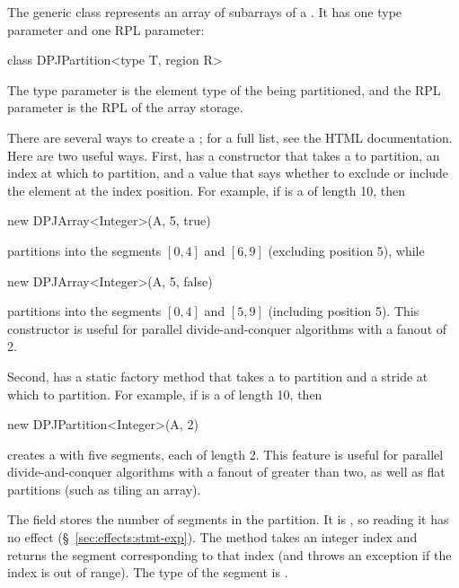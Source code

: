   The generic 
class represents an array of subarrays of a .  It has
one type parameter and one RPL parameter:
%
\begin{dpjlisting}
class DPJPartition<type T, region R>
\end{dpjlisting}
%
The type parameter is the element type of the  being
partitioned, and the RPL parameter is the RPL of the array storage.

 There are several ways to
create a ; for a full list, see the HTML
documentation.  Here are two useful ways.  First, 
has a constructor that takes a  to partition, an index
at which to partition, and a  value that says whether to
exclude or include the element at the index position.  For example, if
 is a  of length 10, then
%
\begin{dpjlisting}
new DPJArray<Integer>(A, 5, true)
\end{dpjlisting}
%
partitions  into the segments $[0,4]$ and $[6,9]$ (excluding
position 5), while
%
\begin{dpjlisting}
new DPJArray<Integer>(A, 5, false)
\end{dpjlisting}
%
partitions  into the segments $[0,4]$ and $[5,9]$ (including
position 5).  This constructor is useful for parallel
divide-and-conquer algorithms with a fanout of 2.

Second,  has a static factory method
 that takes a  to partition and a
stride at which to partition.  For example, if  is a
 of length 10, then
%
\begin{dpjlisting}
new DPJPartition<Integer>(A, 2)
\end{dpjlisting}
%
creates a  with five segments, each of
length 2.  This feature is useful for parallel divide-and-conquer
algorithms with a fanout of greater than two, as well as flat
partitions (such as tiling an array).

 The field  stores the number
of segments in the partition.  It is , so reading it has no
effect (\S~\ref{sec:effects:stmt-exp}).  The method  takes an
integer index  and returns the segment corresponding to that
index (and throws an exception if the index is out of range).  The
type of the segment is .

